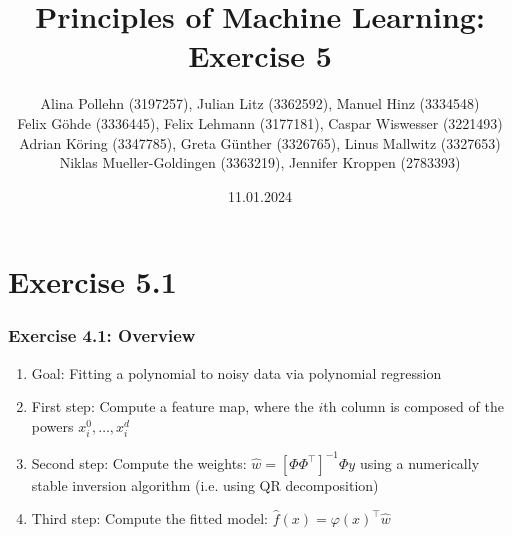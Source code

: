 \documentclass[10pt,aspectratio=169,handout]{beamer}
\begin{document}
\title{Principles of Machine Learning: Exercise 5}
\date{11.01.2024}
\author{Alina Pollehn (3197257), Julian Litz (3362592), Manuel Hinz (3334548)\\
    Felix Göhde (3336445), Felix Lehmann (3177181), Caspar Wiswesser (3221493)\\
    Adrian Köring (3347785), Greta Günther (3326765), Linus Mallwitz (3327653)\\
    Niklas Mueller-Goldingen (3363219), Jennifer Kroppen (2783393)}

\begin{frame}
    \maketitle
\end{frame}

\section{Exercise 5.1}

\begin{frame}

    \frametitle{Exercise 4.1: Overview}

    \begin{enumerate}
        \item Goal: Fitting a polynomial to noisy data via polynomial regression
        \item First step: Compute a feature map, where the $i$th column is composed of the powers $x_i^0,\dots,x_i^d$
        \item Second step: Compute the weights: $\hat{w}=[\Phi\Phi^\intercal]^{-1}\Phi y$ using a numerically stable inversion algorithm (i.e. using QR decomposition)
        \item Third step: Compute the fitted model: $\hat{f}(x)=\varphi(x)^\intercal \hat{w}$
    \end{enumerate}

\end{frame}
\end{document}
